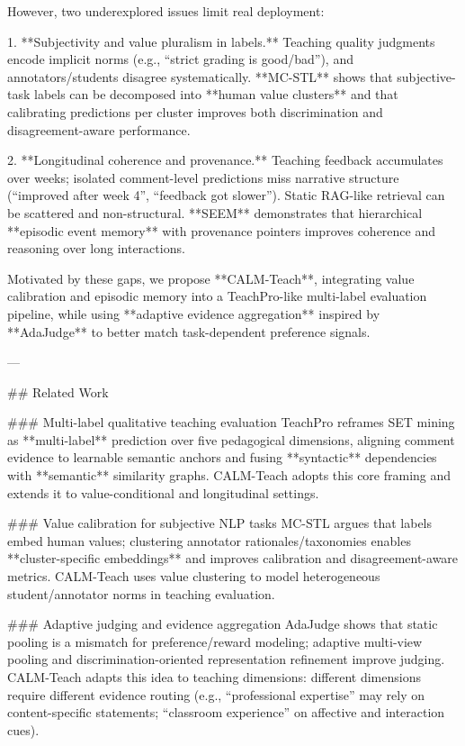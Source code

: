 However, two underexplored issues limit real deployment:

1. **Subjectivity and value pluralism in labels.** Teaching quality judgments encode implicit norms (e.g., “strict grading is good/bad”), and annotators/students disagree systematically. **MC-STL** shows that subjective-task labels can be decomposed into **human value clusters** and that calibrating predictions per cluster improves both discrimination and disagreement-aware performance.

2. **Longitudinal coherence and provenance.** Teaching feedback accumulates over weeks; isolated comment-level predictions miss narrative structure (“improved after week 4”, “feedback got slower”). Static RAG-like retrieval can be scattered and non-structural. **SEEM** demonstrates that hierarchical **episodic event memory** with provenance pointers improves coherence and reasoning over long interactions.

Motivated by these gaps, we propose **CALM-Teach**, integrating value calibration and episodic memory into a TeachPro-like multi-label evaluation pipeline, while using **adaptive evidence aggregation** inspired by **AdaJudge** to better match task-dependent preference signals.

---

## Related Work  

### Multi-label qualitative teaching evaluation  
TeachPro reframes SET mining as **multi-label** prediction over five pedagogical dimensions, aligning comment evidence to learnable semantic anchors and fusing **syntactic** dependencies with **semantic** similarity graphs. CALM-Teach adopts this core framing and extends it to value-conditional and longitudinal settings.

### Value calibration for subjective NLP tasks  
MC-STL argues that labels embed human values; clustering annotator rationales/taxonomies enables **cluster-specific embeddings** and improves calibration and disagreement-aware metrics. CALM-Teach uses value clustering to model heterogeneous student/annotator norms in teaching evaluation.

### Adaptive judging and evidence aggregation  
AdaJudge shows that static pooling is a mismatch for preference/reward modeling; adaptive multi-view pooling and discrimination-oriented representation refinement improve judging. CALM-Teach adapts this idea to teaching dimensions: different dimensions require different evidence routing (e.g., “professional expertise” may rely on content-specific statements; “classroom experience” on affective and interaction cues).

